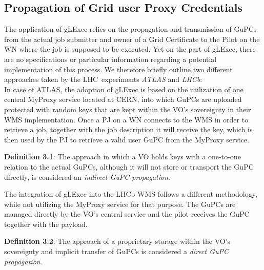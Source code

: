 \documentclass[10pt]{iopart}
\newcommand{\cern}{CERN}
\newcommand{\lhc}{LHC}
\newcommand{\atlas}{ATLAS}
\newcommand{\lhcb}{LHCb}
\begin{document}
\subsection{Propagation of Grid user Proxy Credentials}
\label{prop}
The application of gLExec relies on the propagation and transmission of GuPCs
from the actual job submitter and owner of a Grid Certificate to the Pilot on
the WN where the job is supposed to be executed.
Yet on the part of gLExec, there are no
specifications or particular information regarding a potential implementation of
this process. We therefore briefly outline two
different approaches taken by the \lhc\ experiments
\textit{\atlas} and \textit{\lhcb}:\\
In case of
\atlas{},
the adoption of gLExec is based on the utilization of one central MyProxy service
located at \cern, into which GuPCs are uploaded protected with random keys that are
kept within the VO's sovereignty in their WMS implementation.  Once a PJ
on a WN connects to the WMS in order to retrieve a job,
together with the job description it will receive the key, which is then used by the PJ to
retrieve a valid user GuPC from the MyProxy service.\\
\par
\begingroup
\leftskip=0.4cm
\noindent
\textbf{Definition 3.1}: The approach in which a VO holds keys with a
one-to-one relation to the actual GuPCs, although it will not store or
transport the GuPC directly, is considered
an \textit{indirect GuPC propagation}.\\
\par
\endgroup\noindent
The integration of gLExec into the \lhcb
{} WMS follows a
different methodology, while not utilizing the MyProxy service for that purpose.
The GuPCs are managed
directly by the VO's central service and
the pilot receives the GuPC together with the payload.\\
\par
\begingroup
\leftskip=0.4cm
\noindent
\textbf{Definition 3.2}: The approach of a proprietary storage within the
VO's sovereignty and implicit transfer of GuPCs is considered a
\textit{direct GuPC propagation}.
\par
\endgroup\noindent
\end{document}
